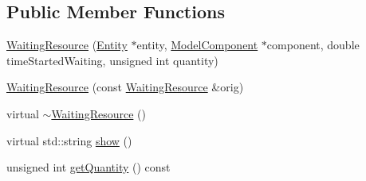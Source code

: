 \subsection*{Public Member Functions}
\begin{DoxyCompactItemize}
\item 
\hyperlink{class_waiting_resource_a845b5f09fb41f14f9d084f17094560d5}{Waiting\-Resource} (\hyperlink{class_entity}{Entity} $\ast$entity, \hyperlink{class_model_component}{Model\-Component} $\ast$component, double time\-Started\-Waiting, unsigned int quantity)
\item 
\hyperlink{class_waiting_resource_a7780ace7c4d94f544e7f894c5daaa2f8}{Waiting\-Resource} (const \hyperlink{class_waiting_resource}{Waiting\-Resource} \&orig)
\item 
virtual \hyperlink{class_waiting_resource_ac25ae06be17218e803d623fb1398aa8a}{$\sim$\-Waiting\-Resource} ()
\item 
virtual std\-::string \hyperlink{class_waiting_resource_afb0323a90d99b50d66de7f38d069b122}{show} ()
\item 
unsigned int \hyperlink{class_waiting_resource_a3a2be33ed8850145e393e8bf29c6c7ca}{get\-Quantity} () const 
\end{DoxyCompactItemize}


